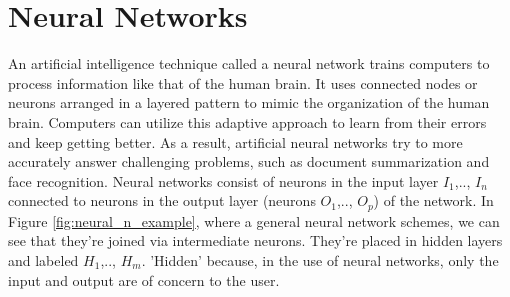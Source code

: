 \section{Neural Networks}
An artificial intelligence technique called a neural network trains computers to process information like that of the human brain. It uses connected nodes or neurons arranged in a layered pattern to mimic the organization of the human brain. Computers can utilize this adaptive approach to learn from their errors and keep getting better. As a result, artificial neural networks try to more accurately answer challenging problems, such as document summarization and face recognition.
\newline Neural networks consist of neurons in the input layer $I_1$,.., $I_n$ connected to neurons in the output layer (neurons $O_1$,.., $O_p$) of the network. In Figure \ref{fig:neural_n_example}, where a general neural network schemes, we can see that they're joined via intermediate neurons. They're placed in hidden layers and labeled $H_1$,.., $H_m$. 'Hidden' because, in the use of neural networks, only the input and output are of concern to the user. 



